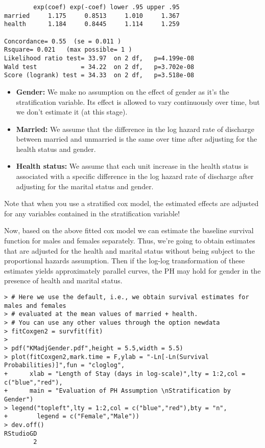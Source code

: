 \begin{enumerate}[(i)]
\begin{spacing}{1.2}
\begin{footnotesize}
\begin{verbatim}
        exp(coef) exp(-coef) lower .95 upper .95
married     1.175     0.8513     1.010     1.367
health      1.184     0.8445     1.114     1.259

Concordance= 0.55  (se = 0.011 )
Rsquare= 0.021   (max possible= 1 )
Likelihood ratio test= 33.97  on 2 df,   p=4.199e-08
Wald test            = 34.22  on 2 df,   p=3.702e-08
Score (logrank) test = 34.33  on 2 df,   p=3.518e-08
\end{verbatim}
\end{footnotesize}
\end{spacing}
\begin{itemize}
\item \textbf{Gender:} We make no assumption on the effect of gender as it's the stratification variable. Its effect is allowed to vary continuously over time, but we don't estimate it (at this stage).
\item \textbf{Married:} We assume that the difference in the log hazard rate of discharge between married and unmarried is the same over time after adjusting for the health status and gender.
\item \textbf{Health status:} We assume that each unit increase in the health status is associated with a specific difference in the log hazard rate of discharge after adjusting for the marital status and gender.
\end{itemize}
Note that when you use a stratified cox model, the estimated effects are adjusted for any
variables contained in the stratification variable!

Now, based on the above fitted cox model we can estimate the baseline survival function for males and females separately. Thus, we're going to obtain estimates that are adjusted for the health and marital status without being subject to the proportional hazards assumption. Then if the log-log transformation of these estimates yields approximately parallel curves, the PH may hold for gender in the presence of health and marital status.
\begin{spacing}{1.2}
\begin{footnotesize}
\begin{verbatim}
> # Here we use the default, i.e., we obtain survival estimates for males and females 
> # evaluated at the mean values of married + health.
> # You can use any other values through the option newdata
> fitCoxgen2 = survfit(fit)
> 
> pdf("KMadjGender.pdf",height = 5.5,width = 5.5)
> plot(fitCoxgen2,mark.time = F,ylab = "-Ln[-Ln(Survival Probabilities)]",fun = "cloglog",
+      xlab = "Length of Stay (days in log-scale)",lty = 1:2,col = c("blue","red"),
+      main = "Evaluation of PH Assumption \nStratification by Gender")
> legend("topleft",lty = 1:2,col = c("blue","red"),bty = "n",
+        legend = c("Female","Male"))
> dev.off()
RStudioGD 
        2 
\end{verbatim}
\end{footnotesize}
\end{spacing}


\end{enumerate}
